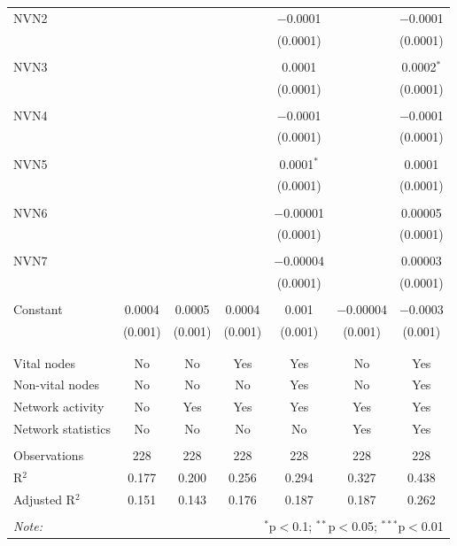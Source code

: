\begin{table}[!htbp]
\begin{tabular}{@{\extracolsep{5pt}}lcccccc}
 NVN2 &  &  &  & $-$0.0001 &  & $-$0.0001 \\ 
  &  &  &  & (0.0001) &  & (0.0001) \\ 
  & & & & & & \\ 
 NVN3 &  &  &  & 0.0001 &  & 0.0002$^{*}$ \\ 
  &  &  &  & (0.0001) &  & (0.0001) \\ 
  & & & & & & \\ 
 NVN4 &  &  &  & $-$0.0001 &  & $-$0.0001 \\ 
  &  &  &  & (0.0001) &  & (0.0001) \\ 
  & & & & & & \\ 
 NVN5 &  &  &  & 0.0001$^{*}$ &  & 0.0001 \\ 
  &  &  &  & (0.0001) &  & (0.0001) \\ 
  & & & & & & \\ 
 NVN6 &  &  &  & $-$0.00001 &  & 0.00005 \\ 
  &  &  &  & (0.0001) &  & (0.0001) \\ 
  & & & & & & \\ 
 NVN7 &  &  &  & $-$0.00004 &  & 0.00003 \\ 
  &  &  &  & (0.0001) &  & (0.0001) \\ 
  & & & & & & \\ 
 Constant & 0.0004 & 0.0005 & 0.0004 & 0.001 & $-$0.00004 & $-$0.0003 \\ 
  & (0.001) & (0.001) & (0.001) & (0.001) & (0.001) & (0.001) \\ 
  & & & & & & \\ 
\hline \\[-1.8ex] 
Vital nodes & No & No & Yes & Yes & No & Yes \\ 
Non-vital nodes & No & No & No & Yes & No & Yes \\ 
Network activity & No & Yes & Yes & Yes & Yes & Yes \\ 
Network statistics & No & No & No & No & Yes & Yes \\ 
\hline &  &  &  &  &  &  \\ 
Observations & 228 & 228 & 228 & 228 & 228 & 228 \\ 
R$^{2}$ & 0.177 & 0.200 & 0.256 & 0.294 & 0.327 & 0.438 \\ 
Adjusted R$^{2}$ & 0.151 & 0.143 & 0.176 & 0.187 & 0.187 & 0.262 \\ 
\hline 
\hline \\[-1.8ex] 
\textit{Note:}  & \multicolumn{6}{r}{$^{*}$p$<$0.1; $^{**}$p$<$0.05; $^{***}$p$<$0.01} \\ 
\end{tabular} 
\end{table} 
